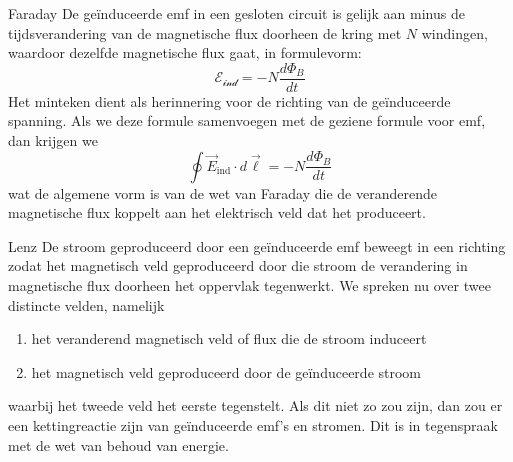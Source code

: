 \begin{lem}[Faraday]{Faraday}
    De geïnduceerde emf in een gesloten circuit is gelijk aan minus de tijdsverandering van de magnetische flux doorheen de kring met $N$ windingen,
    waardoor dezelfde magnetische flux gaat, in formulevorm:
    \begin{equation*}
        \mathcal{E_{\text{ind}}} = -N\dfrac{d\Phi_{B}}{dt}
    \end{equation*}
    Het minteken dient als herinnering voor de richting van de geïnduceerde spanning. Als we deze formule samenvoegen met de geziene formule voor emf, 
    dan krijgen we
    \begin{equation*}
        \oint \Vec{E}_{\text{ind}} \cdot d\Vec{\ell} = -N\dfrac{d\Phi_{B}}{dt}
    \end{equation*}
    wat de algemene vorm is van de wet van Faraday die de veranderende magnetische flux koppelt aan het elektrisch veld dat het produceert.
\end{lem}

\begin{lem}[Lenz]{Lenz}
    De stroom geproduceerd door een geïnduceerde emf beweegt in een richting zodat het magnetisch veld geproduceerd 
    door die stroom de verandering in magnetische flux doorheen het oppervlak tegenwerkt. We spreken nu over twee distincte velden, namelijk
    \begin{enumerate}
        \item het veranderend magnetisch veld of flux die de stroom induceert
        \item het magnetisch veld geproduceerd door de geïnduceerde stroom
    \end{enumerate}
    waarbij het tweede veld het eerste tegenstelt. Als dit niet zo zou zijn, dan zou er een kettingreactie zijn van
    geïnduceerde emf's en stromen. Dit is in tegenspraak met de wet van behoud van energie.
\end{lem}

